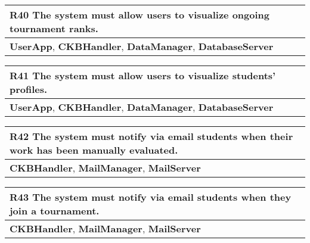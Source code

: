 \begin{table}[H]
    \begin{tabularx}{\textwidth}{X}
        \toprule
        \textbf{R40} The system must allow users to visualize ongoing tournament ranks. \\ \midrule
        \textbf{UserApp}, \textbf{CKBHandler}, \textbf{DataManager}, \textbf{DatabaseServer}                      \\
    \end{tabularx}
\end{table}

\begin{table}[H]
    \begin{tabularx}{\textwidth}{X}
        \toprule
        \textbf{R41} The system must allow users to visualize students' profiles.  \\ \midrule
        \textbf{UserApp}, \textbf{CKBHandler}, \textbf{DataManager}, \textbf{DatabaseServer}                    \\
    \end{tabularx}
\end{table}

\begin{table}[H]
    \begin{tabularx}{\textwidth}{X}
        \toprule
        \textbf{R42} The system must notify via email students when their work has been manually evaluated. \\ \midrule
        \textbf{CKBHandler}, \textbf{MailManager}, \textbf{MailServer} \\    
    \end{tabularx}
\end{table}

\begin{table}[H]
    \begin{tabularx}{\textwidth}{X}
        \toprule
        \textbf{R43} The system must notify via email students when they join a tournament. \\  \midrule
        \textbf{CKBHandler}, \textbf{MailManager}, \textbf{MailServer} \\    
    \end{tabularx}
\end{table}